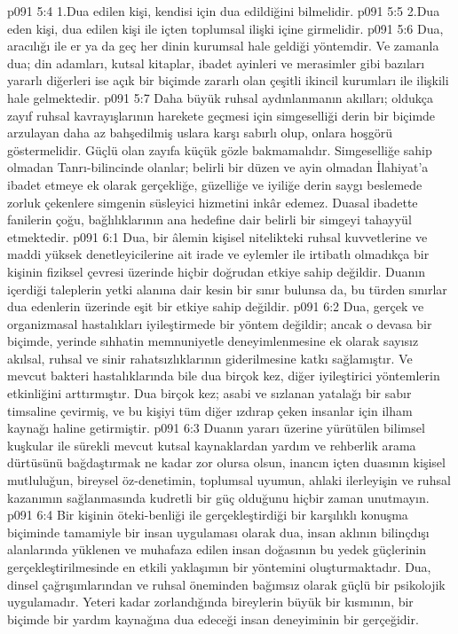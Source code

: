 \vs p091 5:4 1.\bibnobreakspace Dua edilen kişi, kendisi için dua edildiğini bilmelidir.
\vs p091 5:5 2.\bibnobreakspace Dua eden kişi, dua edilen kişi ile içten toplumsal ilişki içine girmelidir.
\vs p091 5:6 Dua, aracılığı ile er ya da geç her dinin kurumsal hale geldiği yöntemdir. Ve zamanla dua; din adamları, kutsal kitaplar, ibadet ayinleri ve merasimler gibi bazıları yararlı diğerleri ise açık bir biçimde zararlı olan çeşitli ikincil kurumları ile ilişkili hale gelmektedir.
\vs p091 5:7 Daha büyük ruhsal aydınlanmanın akılları; oldukça zayıf ruhsal kavrayışlarının harekete geçmesi için simgeselliği derin bir biçimde arzulayan daha az bahşedilmiş uslara karşı sabırlı olup, onlara hoşgörü göstermelidir. Güçlü olan zayıfa küçük gözle bakmamalıdır. Simgeselliğe sahip olmadan Tanrı\hyp{}bilincinde olanlar; belirli bir düzen ve ayin olmadan İlahiyat’a ibadet etmeye ek olarak gerçekliğe, güzelliğe ve iyiliğe derin saygı beslemede zorluk çekenlere simgenin süsleyici hizmetini inkâr edemez. Duasal ibadette fanilerin çoğu, bağlılıklarının ana hedefine dair belirli bir simgeyi tahayyül etmektedir.
\vs p091 6:1 Dua, bir âlemin kişisel nitelikteki ruhsal kuvvetlerine ve maddi yüksek denetleyicilerine ait irade ve eylemler ile irtibatlı olmadıkça bir kişinin fiziksel çevresi üzerinde hiçbir doğrudan etkiye sahip değildir. Duanın içerdiği taleplerin yetki alanına dair kesin bir sınır bulunsa da, bu türden sınırlar dua edenlerin üzerinde eşit bir etkiye sahip değildir.
\vs p091 6:2 Dua, gerçek ve organizmasal hastalıkları iyileştirmede bir yöntem değildir; ancak o devasa bir biçimde, yerinde sıhhatin memnuniyetle deneyimlenmesine ek olarak sayısız akılsal, ruhsal ve sinir rahatsızlıklarının giderilmesine katkı sağlamıştır. Ve mevcut bakteri hastalıklarında bile dua birçok kez, diğer iyileştirici yöntemlerin etkinliğini arttırmıştır. Dua birçok kez; asabi ve sızlanan yatalağı bir sabır timsaline çevirmiş, ve bu kişiyi tüm diğer ızdırap çeken insanlar için ilham kaynağı haline getirmiştir.
\vs p091 6:3 Duanın yararı üzerine yürütülen bilimsel kuşkular ile sürekli mevcut kutsal kaynaklardan yardım ve rehberlik arama dürtüsünü bağdaştırmak ne kadar zor olursa olsun, inancın içten duasının kişisel mutluluğun, bireysel öz\hyp{}denetimin, toplumsal uyumun, ahlaki ilerleyişin ve ruhsal kazanımın sağlanmasında kudretli bir güç olduğunu hiçbir zaman unutmayın.
\vs p091 6:4 Bir kişinin öteki\hyp{}benliği ile gerçekleştirdiği bir karşılıklı konuşma biçiminde tamamiyle bir insan uygulaması olarak dua, insan aklının bilinçdışı alanlarında yüklenen ve muhafaza edilen insan doğasının bu yedek güçlerinin gerçekleştirilmesinde en etkili yaklaşımın bir yöntemini oluşturmaktadır. Dua, dinsel çağrışımlarından ve ruhsal öneminden bağımsız olarak güçlü bir psikolojik uygulamadır. Yeteri kadar zorlandığında bireylerin büyük bir kısmının, bir biçimde bir yardım kaynağına dua edeceği insan deneyiminin bir gerçeğidir.
